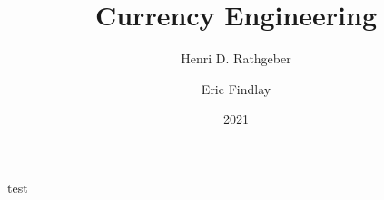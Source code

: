 \documentclass[a4paper]{article}
\begin{document}
\title{Currency Engineering}
\author{Henri D. Rathgeber \and Eric Findlay}
\date{2021}
\maketitle

test
\end{document}
